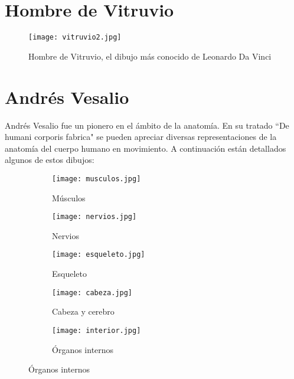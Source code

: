 \section{Hombre de Vitruvio} \label{app:vitruvio}

\begin{figure}[H]
    \centering
    \texttt{[image: vitruvio2.jpg]}
    \caption{Hombre de Vitruvio, el dibujo más conocido de Leonardo Da Vinci} %
\end{figure}

\section{Andrés Vesalio} \label{app:vesalio}

Andrés Vesalio fue un pionero en el ámbito de la anatomía. En su tratado ``De humani corporis fabrica" se pueden apreciar diversas representaciones de la anatomía del cuerpo humano en movimiento. A continuación están detallados algunos de estos dibujos:
\begin{figure}[H]
    \centering
        \begin{subfigure}[b]{0.28\textwidth}
             \texttt{[image: musculos.jpg]}
             \caption{Músculos}
        \end{subfigure}
        \begin{subfigure}[b]{0.28\textwidth}
             \texttt{[image: nervios.jpg]}
             \caption{Nervios}
        \end{subfigure}
        \begin{subfigure}[b]{0.28\textwidth}
            \texttt{[image: esqueleto.jpg]}
            \caption{Esqueleto}
        \end{subfigure}
        \begin{subfigure}[b]{0.37\textwidth}
             \texttt{[image: cabeza.jpg]}
             \caption{Cabeza y cerebro}
        \end{subfigure}
        \begin{subfigure}[b]{0.3\textwidth}
             \texttt{[image: interior.jpg]}
             \caption{Órganos internos}
        \end{subfigure}
\end{figure}
